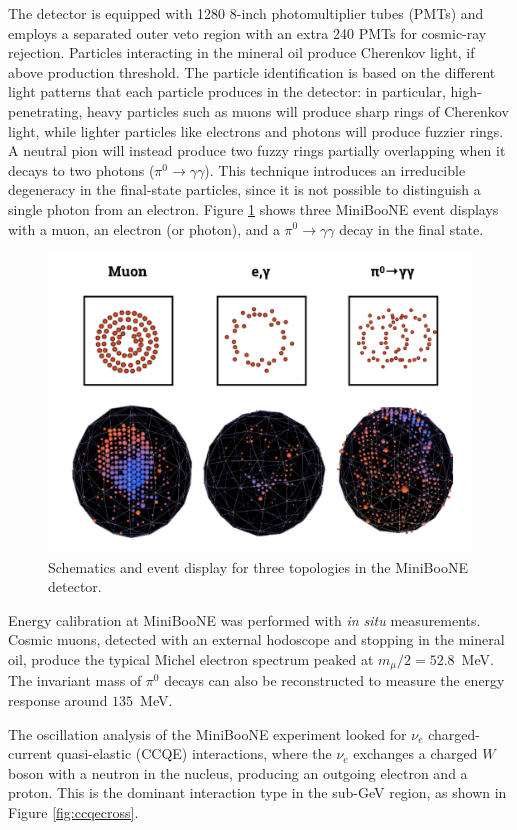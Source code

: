 The detector is equipped with 1280 8-inch photomultiplier tubes (PMTs) and employs a separated outer veto region with an extra 240 PMTs for cosmic-ray rejection. Particles interacting in the mineral oil produce Cherenkov light, if above production threshold. The particle identification is based on the different light patterns that each particle produces in the detector: in particular, high-penetrating, heavy particles such as muons will produce sharp rings of Cherenkov light, while lighter particles like electrons and photons will produce fuzzier rings. A neutral pion will instead produce two fuzzy rings partially overlapping when it decays to two photons ($\pi^{0}\rightarrow \gamma\gamma$). 
This technique introduces an irreducible degeneracy in the final-state particles, since it is not possible to distinguish a single photon from an electron. Figure \ref{fig:miniboone_evd} shows three MiniBooNE event displays with a muon, an electron (or photon), and a $\pi^0\rightarrow\gamma\gamma$ decay in the final state.

\begin{figure}[htbp]
    \centering
    \includegraphics[width=0.85\linewidth]{figures/miniboone_evd.png}
    \caption{Schematics and event display for three topologies in the MiniBooNE detector.}
    \label{fig:miniboone_evd}
\end{figure}

Energy calibration at MiniBooNE was performed with \emph{in situ} measurements. Cosmic muons, detected with an external hodoscope and stopping in the mineral oil, produce the typical Michel electron spectrum peaked at $m_{\mu}/2 = 52.8$~MeV. The invariant mass of $\pi^0$ decays can also be reconstructed to measure the energy response around $135$~MeV. 

The oscillation analysis of the MiniBooNE experiment looked for $\nu_e$ charged-current quasi-elastic (CCQE) interactions, where the $\nu_{e}$ exchanges a charged $W$ boson with a neutron in the nucleus, producing an outgoing electron and a proton. This is the dominant interaction type in the sub-GeV region, as shown in Figure \ref{fig:ccqecross}.

